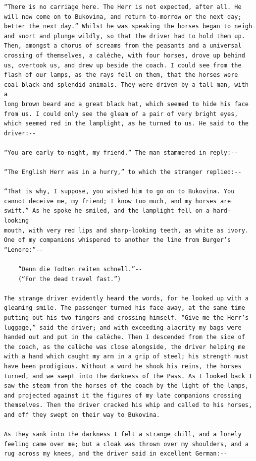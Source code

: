 \documentclass{article}
\begin{document}
\begin{verbatim}
“There is no carriage here. The Herr is not expected, after all. He
will now come on to Bukovina, and return to-morrow or the next day;
better the next day.” Whilst he was speaking the horses began to neigh
and snort and plunge wildly, so that the driver had to hold them up.
Then, amongst a chorus of screams from the peasants and a universal
crossing of themselves, a calèche, with four horses, drove up behind
us, overtook us, and drew up beside the coach. I could see from the
flash of our lamps, as the rays fell on them, that the horses were
coal-black and splendid animals. They were driven by a tall man, with a
long brown beard and a great black hat, which seemed to hide his face
from us. I could only see the gleam of a pair of very bright eyes,
which seemed red in the lamplight, as he turned to us. He said to the
driver:--

“You are early to-night, my friend.” The man stammered in reply:--

“The English Herr was in a hurry,” to which the stranger replied:--

“That is why, I suppose, you wished him to go on to Bukovina. You
cannot deceive me, my friend; I know too much, and my horses are
swift.” As he spoke he smiled, and the lamplight fell on a hard-looking
mouth, with very red lips and sharp-looking teeth, as white as ivory.
One of my companions whispered to another the line from Burger’s
“Lenore:”--

    “Denn die Todten reiten schnell.”--
    (“For the dead travel fast.”)

The strange driver evidently heard the words, for he looked up with a
gleaming smile. The passenger turned his face away, at the same time
putting out his two fingers and crossing himself. “Give me the Herr’s
luggage,” said the driver; and with exceeding alacrity my bags were
handed out and put in the calèche. Then I descended from the side of
the coach, as the calèche was close alongside, the driver helping me
with a hand which caught my arm in a grip of steel; his strength must
have been prodigious. Without a word he shook his reins, the horses
turned, and we swept into the darkness of the Pass. As I looked back I
saw the steam from the horses of the coach by the light of the lamps,
and projected against it the figures of my late companions crossing
themselves. Then the driver cracked his whip and called to his horses,
and off they swept on their way to Bukovina.

As they sank into the darkness I felt a strange chill, and a lonely
feeling came over me; but a cloak was thrown over my shoulders, and a
rug across my knees, and the driver said in excellent German:--


\end{verbatim}
\end{document}
